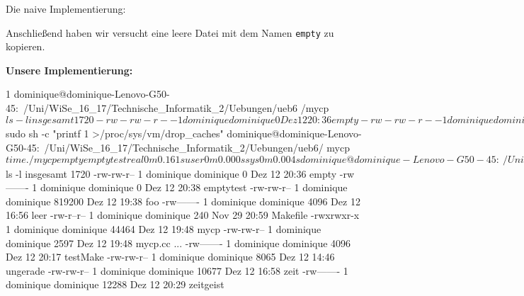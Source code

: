 \documentclass{ti2}
\begin{document}
Die naive Implementierung:

Anschließend haben wir versucht eine leere Datei mit dem Namen \texttt{empty} zu kopieren.

\textbf{Unsere Implementierung:}
\begin{listing}{1}
dominique@dominique-Lenovo-G50-45:~/Uni/WiSe_16_17/Technische_Informatik_2/Uebungen/ueb6
/mycp$ ls -l
insgesamt 1720
-rw-rw-r-- 1 dominique dominique      0 Dez 12 20:36 empty
-rw-rw-r-- 1 dominique dominique 819200 Dez 12 19:38 foo
-rw------- 1 dominique dominique   4096 Dez 12 16:56 leer
-rw-r--r-- 1 dominique dominique    240 Nov 29 20:59 Makefile
-rwxrwxr-x 1 dominique dominique  44464 Dez 12 19:48 mycp
-rw-rw-r-- 1 dominique dominique   2597 Dez 12 19:48 mycp.cc
...
-rw-rw-r-- 1 dominique dominique   8065 Dez 12 14:46 ungerade
-rw-rw-r-- 1 dominique dominique  10677 Dez 12 16:58 zeit
-rw------- 1 dominique dominique  12288 Dez 12 20:29 zeitgeist
dominique@dominique-Lenovo-G50-45:~/Uni/WiSe_16_17/Technische_Informatik_2/Uebungen/ueb6/
mycp$ sudo sh -c "printf 1 >/proc/sys/vm/drop_caches"
dominique@dominique-Lenovo-G50-45:~/Uni/WiSe_16_17/Technische_Informatik_2/Uebungen/ueb6/
mycp$ time ./mycp empty emptytest

real	0m0.161s
user	0m0.000s
sys	0m0.004s
dominique@dominique-Lenovo-G50-45:~/Uni/WiSe_16_17/Technische_Informatik_2/Uebungen/ueb6/
mycp$ ls -l
insgesamt 1720
-rw-rw-r-- 1 dominique dominique      0 Dez 12 20:36 empty
-rw------- 1 dominique dominique      0 Dez 12 20:38 emptytest
-rw-rw-r-- 1 dominique dominique 819200 Dez 12 19:38 foo
-rw------- 1 dominique dominique   4096 Dez 12 16:56 leer
-rw-r--r-- 1 dominique dominique    240 Nov 29 20:59 Makefile
-rwxrwxr-x 1 dominique dominique  44464 Dez 12 19:48 mycp
-rw-rw-r-- 1 dominique dominique   2597 Dez 12 19:48 mycp.cc
...
-rw------- 1 dominique dominique   4096 Dez 12 20:17 testMake
-rw-rw-r-- 1 dominique dominique   8065 Dez 12 14:46 ungerade
-rw-rw-r-- 1 dominique dominique  10677 Dez 12 16:58 zeit
-rw------- 1 dominique dominique  12288 Dez 12 20:29 zeitgeist
\end{listing}
\end{document}
